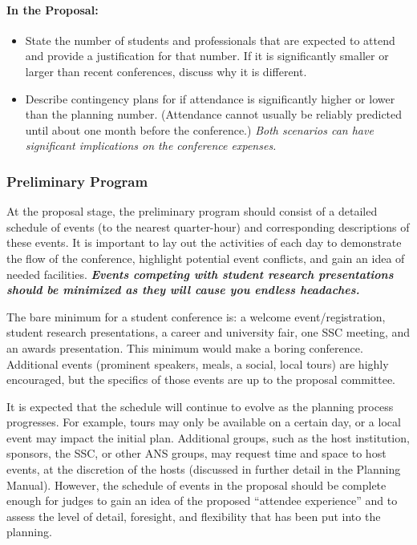 \documentclass[12pt]{article}
\begin{document}
\paragraph{In the Proposal:}
\begin{itemize}
    \item{State the number of students and professionals that are expected to attend and provide a justification for that number. If it is significantly smaller or larger than recent conferences, discuss why it is different.}
    \item{Describe contingency plans for if attendance is significantly higher or lower than the planning number. (Attendance cannot usually be reliably predicted until about one month before the conference.) \emph{Both scenarios can have significant implications on the conference expenses.}}
\end{itemize}

\subsubsection{Preliminary Program}
At the proposal stage, the preliminary program should consist of a detailed schedule of events (to the nearest quarter-hour) and corresponding descriptions of these events. It is important to lay out the activities of each day to demonstrate the flow of the conference, highlight potential event conflicts, and gain an idea of needed facilities. \textit{\textbf{Events competing with student research presentations should be minimized as they will cause you endless headaches.}}

The bare minimum for a student conference is: a welcome event/registration, student research presentations, a career and university fair, one SSC meeting, and an awards presentation. This minimum would make a boring conference. Additional events (prominent speakers, meals, a social, local tours) are highly encouraged, but the specifics of those events are up to the proposal committee.

It is expected that the schedule will continue to evolve as the planning process progresses. For example, tours may only be available on a certain day, or a local event may impact the initial plan. Additional groups, such as the host institution, sponsors, the SSC, or other ANS groups, may request time and space to host events, at the discretion of the hosts (discussed in further detail in the Planning Manual). However, the schedule of events in the proposal should be complete enough for judges to gain an idea of the proposed ``attendee experience” and to assess the level of detail, foresight, and flexibility that has been put into the planning.
\end{document}
